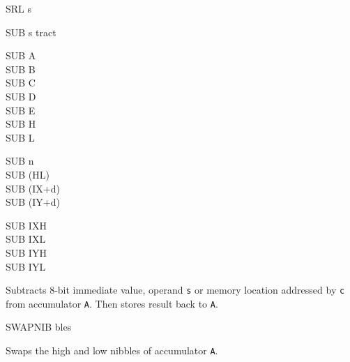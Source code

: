 \documentclass[12pt,twoside,openright,a4paper]{book}
\begin{document}
\begin{basedescript}{
	\desclabelstyle{\multilinelabel}
	\desclabelwidth{3cm}}
\begin{DetailItem}{SRL s}
	\end{DetailItem}

	\pagebreak
	\begin{DetailItem}{SUB s}
		{tract}
		{}

		\begin{DetailVariants}
			SUB A\\
			SUB B\\
			SUB C\\
			SUB D\\
			SUB E\\
			SUB H\\
			SUB L

			\columnbreak
			SUB n\\
			SUB (HL)\\
			SUB (IX+d)\\
			SUB (IY+d)

			\columnbreak
			SUB IXH\UNDOC\\
			SUB IXL\UNDOC\\
			SUB IYH\UNDOC\\
			SUB IYL\UNDOC
		\end{DetailVariants}

		Subtracts 8-bit immediate value, operand {\tt s} or memory location addressed by {\tt c} from accumulator {\tt A}. Then stores result back to {\tt A}.

		\begin{DetailEffects}[v]
			\FlagsSUBr
		\end{DetailEffects}
						
		\begin{DetailTiming}
		\end{DetailTiming}

	\end{DetailItem}

	\begin{DetailItem}{SWAPNIB\ZXN}
		{ bles}
		{\SymSWAPNIB}

		Swaps the high and low nibbles of accumulator {\tt A}.

		\begin{DetailEffects}
			\FlagsSWAPNIB
		\end{DetailEffects}
						
		\begin{DetailTiming}
			\DetailTime{2}{8}
		\end{DetailTiming}


\end{DetailItem}
\end{basedescript}
\end{document}
